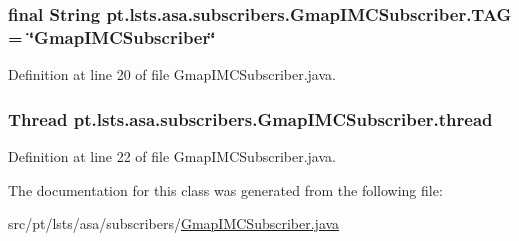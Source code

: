 \hypertarget{classpt_1_1lsts_1_1asa_1_1subscribers_1_1GmapIMCSubscriber_a82931d20557266c733e1f2232aa862ee}{}
\subsubsection[{T\+A\+G}]{\setlength{\rightskip}{0pt plus 5cm}final String pt.\+lsts.\+asa.\+subscribers.\+Gmap\+I\+M\+C\+Subscriber.\+T\+A\+G = \char`\"{}Gmap\+I\+M\+C\+Subscriber\char`\"{}\hspace{0.3cm}{\ttfamily [private]}}\label{classpt_1_1lsts_1_1asa_1_1subscribers_1_1GmapIMCSubscriber_a82931d20557266c733e1f2232aa862ee}


Definition at line 20 of file Gmap\+I\+M\+C\+Subscriber.\+java.

\hypertarget{classpt_1_1lsts_1_1asa_1_1subscribers_1_1GmapIMCSubscriber_a660f1cda16c29729aec264c80f9b6bec}{}
\subsubsection[{thread}]{\setlength{\rightskip}{0pt plus 5cm}Thread pt.\+lsts.\+asa.\+subscribers.\+Gmap\+I\+M\+C\+Subscriber.\+thread\hspace{0.3cm}{\ttfamily [private]}}\label{classpt_1_1lsts_1_1asa_1_1subscribers_1_1GmapIMCSubscriber_a660f1cda16c29729aec264c80f9b6bec}


Definition at line 22 of file Gmap\+I\+M\+C\+Subscriber.\+java.



The documentation for this class was generated from the following file\+:\begin{DoxyCompactItemize}
\item 
src/pt/lsts/asa/subscribers/\hyperlink{GmapIMCSubscriber_8java}{Gmap\+I\+M\+C\+Subscriber.\+java}\end{DoxyCompactItemize}
